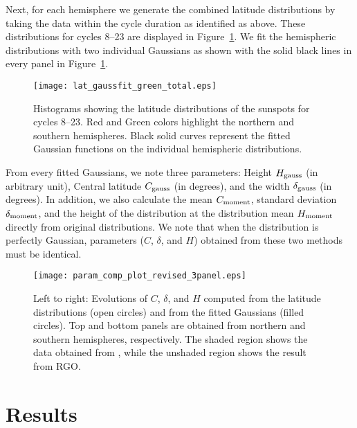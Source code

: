 \documentclass[preprint2,times,tighten]{aastex61}
\newcommand{\Fig}[1]{Figure~\ref{#1}}
\begin{document}
Next, for each hemisphere we generate the combined latitude distributions 
by taking the data within the cycle duration as identified as above.
These distributions for cycles 8--23 are displayed in \Fig{gauss_fit}. 
We fit the hemispheric distributions with two individual Gaussians as shown with the solid black lines in every panel in \Fig{gauss_fit}.
\begin{figure}%
\centering
\texttt{[image: lat\_gaussfit\_green\_total.eps]}
\caption{Histograms showing the latitude distributions of the sunspots for cycles 8--23. Red and Green colors highlight the northern and southern hemispheres. Black solid curves represent the fitted Gaussian functions on the individual hemispheric distributions.} 
\label{gauss_fit}
\end{figure}
From every fitted Gaussians, we note three parameters: Height $H_{\rm{ gauss}}$ (in arbitrary unit), 
Central latitude $C_{\rm{ gauss}}$ (in degrees), and the width $\delta_{\rm{ gauss}}$ (in degrees).  
In addition, we also calculate the mean $C_{\rm{ moment}}$, standard deviation $\delta_{\rm{ moment}}$,
and the height of the distribution at the distribution mean $H_{\rm{ moment}}$
directly from original distributions. 
We note that when the distribution is perfectly Gaussian, 
parameters ($C$, $\delta$, and $H$) obtained from these two methods must be identical.

\begin{figure*}[!htb]
\centering
\texttt{[image: param\_comp\_plot\_revised\_3panel.eps]}
\caption{Left to right: Evolutions of $C$, $\delta$, and $H$ computed from the latitude distributions (open circles) 
and from the fitted Gaussians (filled circles). Top and bottom panels are obtained from northern and southern hemispheres, respectively.
The shaded region shows the data obtained from \citet{2017A&A...599A.131L}, while the unshaded region shows the result from RGO.
}
\label{param_evolve}
\end{figure*}

\section{Results}
\end{document}
